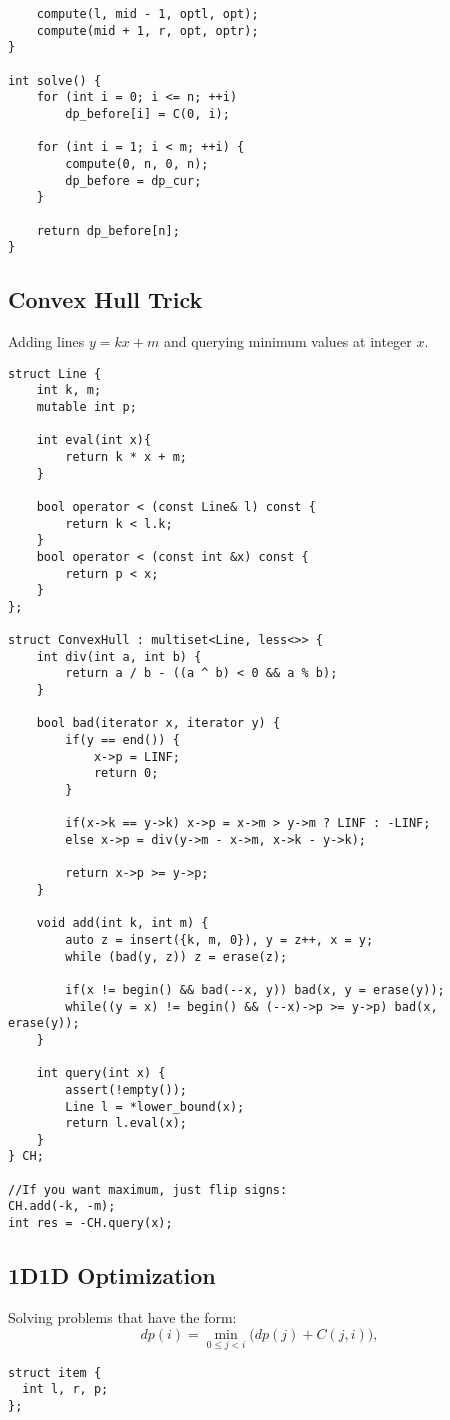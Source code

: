 \documentclass[11pt,a4paper]{article}
\begin{document}
\begin{multicols*}{2}
\begin{lstlisting}
    compute(l, mid - 1, optl, opt);
    compute(mid + 1, r, opt, optr);
}

int solve() {
    for (int i = 0; i <= n; ++i)
        dp_before[i] = C(0, i);

    for (int i = 1; i < m; ++i) {
        compute(0, n, 0, n);
        dp_before = dp_cur;
    }

    return dp_before[n];
}
\end{lstlisting}

\subsection{Convex Hull Trick}
Adding lines $y = kx + m$ and querying minimum values at integer $x$.
\begin{lstlisting}
struct Line {
    int k, m;
    mutable int p;
    
    int eval(int x){
    	return k * x + m;
    }
    
    bool operator < (const Line& l) const {
        return k < l.k;
    }
    bool operator < (const int &x) const {
        return p < x;
    }
};
 
struct ConvexHull : multiset<Line, less<>> {
    int div(int a, int b) {
        return a / b - ((a ^ b) < 0 && a % b);
    }

    bool bad(iterator x, iterator y) {
        if(y == end()) { 
            x->p = LINF;
            return 0; 
        }

        if(x->k == y->k) x->p = x->m > y->m ? LINF : -LINF;
        else x->p = div(y->m - x->m, x->k - y->k);

        return x->p >= y->p;
    }

    void add(int k, int m) {
        auto z = insert({k, m, 0}), y = z++, x = y;
        while (bad(y, z)) z = erase(z);

        if(x != begin() && bad(--x, y)) bad(x, y = erase(y));
        while((y = x) != begin() && (--x)->p >= y->p) bad(x, erase(y));
    }

    int query(int x) {
        assert(!empty());
        Line l = *lower_bound(x);
        return l.eval(x);
    }
} CH;

//If you want maximum, just flip signs: 
CH.add(-k, -m);
int res = -CH.query(x);
\end{lstlisting}

\subsection{1D1D Optimization}
Solving problems that have the form: 
\[
dp(i) = \min_{0 \leq j < i} \Big( dp(j) + C(j, i) \Big),
\]
\begin{lstlisting}
struct item {
  int l, r, p;
};


\end{lstlisting}
\end{multicols*}
\end{document}
